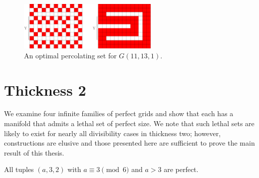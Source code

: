 \begin{figure}[]
\centering
\includegraphics[width=0.6\textwidth]{figures/7/11x13x1.pdf}
\caption{An optimal percolating set for $G(11,13,1)$.}
\label{fig:11x13x1}
\end{figure} 


\section{Thickness 2}

We examine four infinite families of perfect grids and show that each has a manifold that admits a lethal set of perfect size. We note that such lethal sets are likely to exist for nearly all divisibility cases in thickness two; however, constructions are elusive and those presented here are sufficient to prove the main result of this thesis.

\begin{con}
\label{con:3x2x(3mod6)}
All tuples $(a,3,2)$ with $a \equiv 3 \pmod 6$ and $a >3$ are perfect. 
\end{con}

